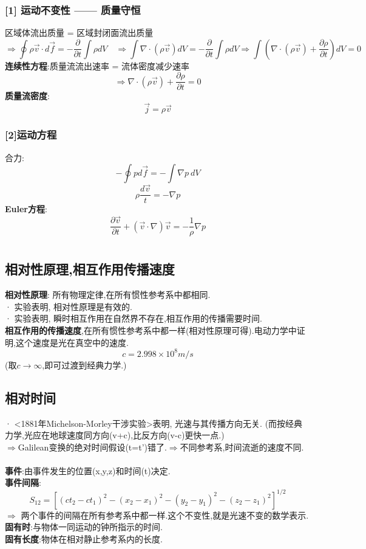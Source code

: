 \documentclass{article}
\begin{document}
\subsubsection{[1] 运动不变性 —— 质量守恒}
区域体流出质量 = 区域封闭面流出质量
$$\Rightarrow \oint \rho \vec v \cdot d \vec f = -\frac{\partial}{\partial t}\int \rho dV \quad \Rightarrow \int \nabla \cdot (\rho \vec v) dV  = -\frac{\partial}{\partial t}\int \rho dV \Rightarrow  \int (\nabla \cdot (\rho \vec v) + \frac{\partial \rho}{\partial t}) dV  = 0$$
\textbf{连续性方程}:质量流流出速率 = 流体密度减少速率
$$\Rightarrow \nabla \cdot (\rho \vec v) +  \frac{\partial \rho}{\partial t} = 0$$
\textbf{质量流密度}:
$$\vec j = \rho \vec v$$

\subsubsection{[2]运动方程}
合力:
$$-\oint p d \vec f = -\int \nabla p\ dV$$
$$\rho \frac{d \vec v}{t} = -\nabla p$$
\textbf{Euler方程}:
$$\frac{\partial \vec v}{\partial t} + (\vec v \cdot \nabla)\vec v = - \frac{1}{\rho}\nabla p$$


\section{}
\subsection{相对性原理,相互作用传播速度}
\textbf{相对性原理}: 所有物理定律,在所有惯性参考系中都相同.\\
· 实验表明, 相对性原理是有效的.\\
· 实验表明, 瞬时相互作用在自然界不存在,相互作用的传播需要时间.\\
\textbf{相互作用的传播速度},在所有惯性参考系中都一样(相对性原理可得).\quad 电动力学中证明,这个速度是光在真空中的速度.
$$c = 2.998 \times 10^8 m/s$$
(取$c\to \infty$,即可过渡到经典力学.)


\subsection{相对时间}
· <1881年Michelson-Morley干涉实验>表明, 光速与其传播方向无关. (而按经典力学,光应在地球速度同方向(v+c),比反方向(v-c)更快一点.)\\
$\Rightarrow$Galilean变换的绝对时间假设(t=t')错了.\quad  $\Rightarrow$不同参考系,时间流逝的速度不同.\\
\\
\textbf{事件}:由事件发生的位置(x,y,z)和时间(t)决定.\\
\textbf{事件间隔}:
$$S_{12} = [(ct_2-ct_1)^2 - (x_2-x_1)^2 - (y_2-y_1)^2 - (z_2-z_1)^2]^{1/2}$$
$\Rightarrow$ 两个事件的间隔在所有参考系中都一样.\quad 这个不变性,就是光速不变的数学表示.\\
\textbf{固有时}:与物体一同运动的钟所指示的时间.\\
\textbf{固有长度}:物体在相对静止参考系内的长度.
\end{document}
